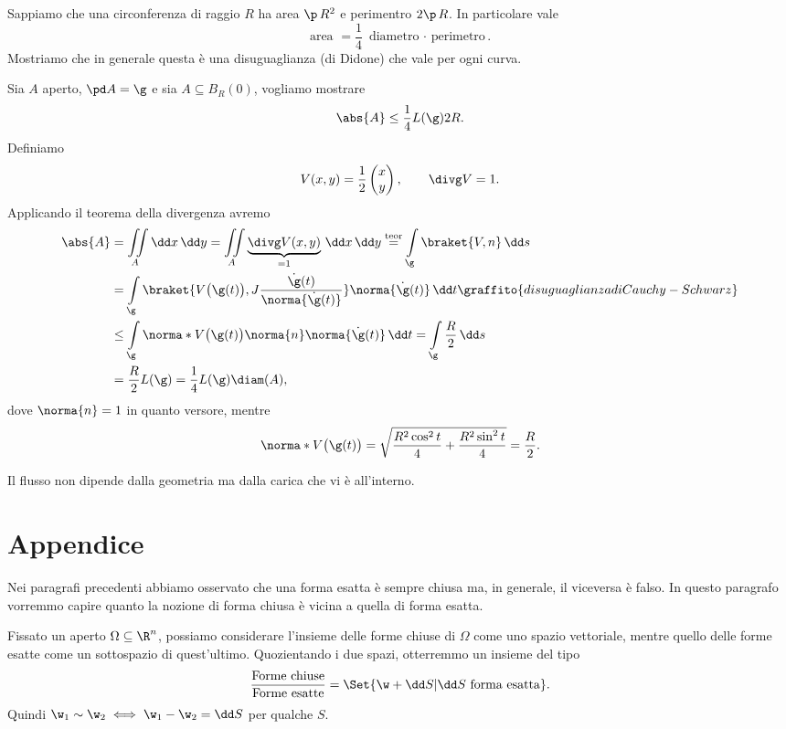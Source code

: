 \begin{ese}
	Sappiamo che una circonferenza di raggio \(R\) ha area \(\p\,R^2\) e perimentro \(2\p\,R\).
	In particolare vale
	\[
		\text{area }= \frac{1}{4}\text{ diametro \(\cdot\) perimetro}.
	\]
	Mostriamo che in generale questa è una disuguaglianza (di Didone) che vale per ogni curva.

	Sia \(A\) aperto, \(\pd A=\g\) e sia \(A\subseteq B_R(0)\), vogliamo mostrare
	\[
		\abs{A} \le \frac{1}{4} L(\g) 2R.
	\]
	Definiamo
	\[
		V(x,y) = \frac{1}{2} \begin{pmatrix}x\\y\end{pmatrix}, \qquad \divg V = 1.
	\]
	Applicando il teorema della divergenza avremo
	\[
		\begin{split}
			\abs{A} & = \iint\limits_A \dd x\,\dd y = \iint\limits_A \underbrace{\divg V(x,y)}_{=1}\,\dd x\,\dd y \overset{\text{teor}}{=} \int\limits_\g \braket{V,n}\,\dd s\\
			& = \int\limits_\g \braket{V\big(\g(t)\big),J \frac{\dot{\g}(t)}{\norma{\dot{\g}(t)}}} \norma{\dot{\g}(t)}\,\dd t\graffito{disuguaglianza di Cauchy-Schwarz}\\
			& \le \int\limits_\g \norma*{V\big(\g(t)\big)} \norma{n} \norma{\dot{\g}(t)}\,\dd t = \int\limits_\g \frac{R}{2}\,\dd s\\
			& = \frac{R}{2} L(\g) = \frac{1}{4}L(\g) \diam(A),
		\end{split}
	\]
	dove \(\norma{n}=1\) in quanto versore, mentre
	\[
		\norma*{V\big(\g(t)\big)} = \sqrt{\frac{R^2\cos^2 t}{4}+ \frac{R^2\sin^2 t}{4}} = \frac{R}{2}.
	\]
\end{ese}
\begin{oss}
	Il flusso non dipende dalla geometria ma dalla carica che vi è all'interno.
\end{oss}
%
%
\section{Appendice}

Nei paragrafi precedenti abbiamo osservato che una forma esatta è sempre chiusa ma, in generale, il viceversa è falso.
In questo paragrafo vorremmo capire quanto la nozione di forma chiusa è vicina a quella di forma esatta.

Fissato un aperto \(\Omega\subseteq \R^n\), possiamo considerare l'insieme delle forme chiuse di \(\Omega\) come uno spazio vettoriale, mentre quello delle forme esatte come un sottospazio di quest'ultimo.
Quozientando i due spazi, otterremmo un insieme del tipo
\[
	\frac{\text{Forme chiuse}}{\text{Forme esatte}} = \Set{\w + \dd S | \dd S \text{ forma esatta}}.
\]
Quindi \(\w_1 \sim \w_2 \iff \w_1 - \w_2 = \dd S\) per qualche \(S\).


